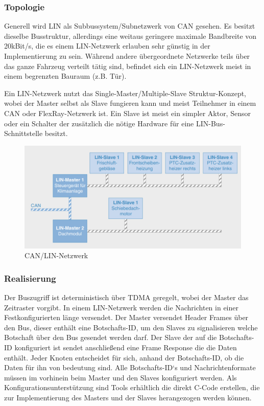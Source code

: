     \subsubsection{Topologie}
    Generell wird LIN als Subbussystem/Subnetzwerk von CAN gesehen. Es besitzt dieselbe
    Busstruktur, allerdings eine weitaus geringere maximale Bandbreite von 20kBit/s, 
    die es einem LIN-Netzwerk erlauben sehr günstig in der Implementierung zu sein.
    Während andere übergeordnete Netzwerke teils über das ganze Fahrzeug verteilt tätig sind,
    befindet sich ein LIN-Netzwerk meist in einem begrenzten Bauraum (z.B. Tür). 
    ~\cite{reif2011bosch}

    Ein LIN-Netzwerk nutzt das Single-Master/Multiple-Slave Struktur-Konzept, wobei der Master
    selbst als Slave fungieren kann und meist Teilnehmer in einem CAN oder FlexRay-Netzwerk ist.
    Ein Slave ist meist ein simpler Aktor, Sensor oder ein Schalter der zusätzlich die nötige Hardware 
    für eine LIN-Bus-Schnittstelle besitzt.
    ~\cite{reif2011bosch}
    ~\cite{LA_LIN1}
    
    \begin{figure}[h!]
        \includegraphics[width=\linewidth]{./images/Kapitel4/LIN_Bus.png}
        \caption[
            Bosch Autoelektrik und Autoelektronik S.111 \cite{reif2011bosch}]
            {CAN/LIN-Netzwerk}
    \end{figure}

    \subsubsection{Realisierung}

    Der Buszugriff ist deterministisch über TDMA geregelt, wobei der Master das Zeitraster vorgibt.
    In einem LIN-Netzwerk werden die Nachrichten in einer Festkonfigurierten länge versendet.
    Der Master versendet Header Frames über den Bus, dieser enthält eine Botschafts-ID, um 
    den Slaves zu signalisieren welche Botschaft über den Bus gesendet werden darf. Der Slave
    der auf die Botschafts-ID konfiguriert ist sendet anschließend eine Frame Response die die 
    Daten enthält. Jeder Knoten entscheidet für sich, anhand der Botschafts-ID, ob die Daten für 
    ihn von bedeutung sind.
    Alle Botschafts-ID‘s und Nachrichtenformate müssen im vorhinein beim
    Master und den Slaves konfiguriert werden. Als Konfigurationsunterstützung sind Tools 
    erhältlich die direkt C-Code erstellen, die zur Implementierung des Masters und der Slaves
    herangezogen werden können.~\cite{LA_LIN1}\cite{LA_LDF-Tool}

